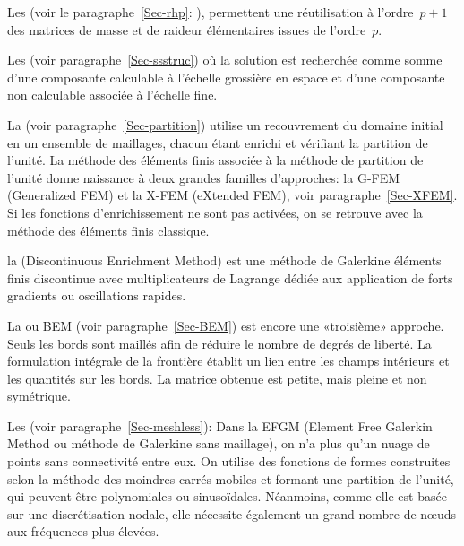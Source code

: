 \medskip
Les  (voir le paragraphe~\ref{Sec-rhp}: ), permettent une réutilisation à l'ordre~$p+1$ des matrices de masse et de raideur élémentaires issues de l'ordre~$p$.

Les  (voir paragraphe~\ref{Sec-ssstruc}) où la solution est recherchée comme somme d'une composante calculable à l'échelle grossière en espace et d'une composante non calculable associée à l'échelle fine.

La  (voir paragraphe~\ref{Sec-partition}) utilise un recouvrement du domaine initial en un ensemble de maillages, chacun étant enrichi et vérifiant la partition de l'unité. La méthode des éléments finis associée à la méthode de partition de l'unité donne naissance à deux grandes familles d'approches: la G-FEM (Generalized FEM) et la X-FEM (eXtended FEM), voir paragraphe~\ref{Sec-XFEM}. Si les fonctions d'enrichissement ne sont pas activées, on se retrouve avec la méthode des éléments finis classique.

la  (Discontinuous Enrichment Method) est une méthode de Galerkine éléments finis discontinue avec multiplicateurs de Lagrange dédiée aux application de forts gradients ou oscillations rapides.

\bigskip
La  ou BEM (voir paragraphe~\ref{Sec-BEM}) est encore une «troisième» approche. Seuls les bords sont maillés afin de réduire le nombre de degrés de liberté. La formulation intégrale de la frontière établit un lien entre les champs intérieurs et les quantités sur les bords. La matrice obtenue est petite, mais pleine et non symétrique.

\bigskip
Les  (voir paragraphe~\ref{Sec-meshless}): Dans la EFGM (Element Free Galerkin Method ou méthode de Galerkine sans maillage), on n'a plus qu'un nuage de points sans connectivité entre eux. On utilise des fonctions de formes construites selon la méthode des moindres carrés mobiles et formant une partition de l'unité, qui peuvent être polynomiales ou sinusoïdales. Néanmoins, comme elle est basée sur une discrétisation nodale, elle nécessite également un grand nombre de nœuds aux fréquences plus élevées.

